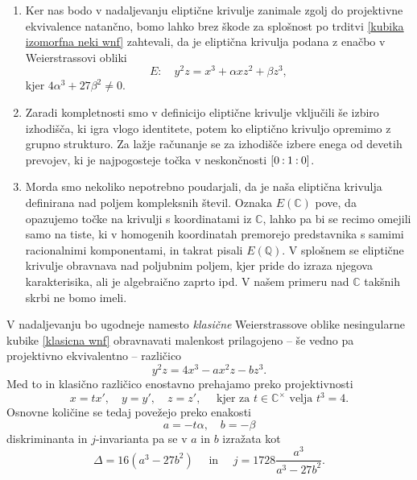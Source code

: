 \documentclass[mat1]{fmfdelo}
\newcommand{\C}{\mathbb C}
\newcommand{\CM}{\mathbb C ^\times}
\newcommand{\Q}{\mathbb Q}
\newcommand{\pcoor}[1]{%
  \begingroup\lccode`~=`: \lowercase{\endgroup
  \edef~}{\mathbin{\mathchar\the\mathcode`:}\nobreak}%
  [%
  \begingroup
  \mathcode`:=\string"8000
  #1%
  \endgroup
  ]%
}
\theoremstyle{definition}
\begin{document}
\begin{opomba}
    \begin{enumerate}
        \item
        Ker nas bodo v nadaljevanju eliptične krivulje zanimale zgolj do projektivne ekvivalence natančno, bomo lahko brez škode za splošnost po trditvi \ref{kubika izomorfna neki wnf} zahtevali, da je eliptična krivulja podana z enačbo v Weierstrassovi obliki
        \[
            E: \quad y^2z = x^3 + \alpha x z^2 + \beta z^3,  
        \]  
        kjer $4\alpha^3 + 27\beta^2 \neq 0$. 
        \item 
        Zaradi kompletnosti smo v definicijo eliptične krivulje vključili še izbiro izhodišča, ki igra vlogo identitete, potem ko eliptično krivuljo opremimo z grupno strukturo. Za lažje računanje se za izhodišče izbere enega od devetih prevojev, ki je najpogosteje točka v neskončnosti $\pcoor{0:1:0}$.  
        \item 
        Morda smo nekoliko nepotrebno poudarjali, da je naša eliptična krivulja definirana nad poljem kompleksnih števil. Oznaka $E(\C)$ pove, da opazujemo točke na krivulji s koordinatami iz $\C$, lahko pa bi se recimo omejili samo na tiste, ki v homogenih koordinatah premorejo predstavnika s samimi racionalnimi komponentami, in takrat pisali $E(\Q)$. V splošnem se eliptične krivulje obravnava nad poljubnim poljem, kjer pride do izraza njegova karakterisika, ali je algebraično zaprto ipd. V našem primeru nad $\C$ takšnih skrbi ne bomo imeli. 
    \end{enumerate}
\end{opomba}

V nadaljevanju bo ugodneje namesto \emph{klasične} Weierstrassove oblike nesingularne kubike \ref{klasicna wnf} obravnavati malenkost prilagojeno -- še vedno pa projektivno ekvivalentno -- različico
\[
    y^2z = 4x^3 - ax^2z - bz^3.  
\]
Med to in klasično različico enostavno prehajamo preko projektivnosti
\[
    x = tx', \quad y = y', \quad z = z', \quad \text{ kjer za } t \in \CM \text{ velja } t^3 = 4.   
\]
Osnovne količine se tedaj povežejo preko enakosti
\[
    a = -t\alpha, \quad b = -\beta    
\]
diskriminanta in $j$-invarianta pa se v $a$ in $b$ izražata kot
\[
    \Delta = 16(a^3 - 27b^2) \quad \text{ in } \quad j = 1728\frac{a^3}{a^3 - 27b^2}.
\]

\end{document}
